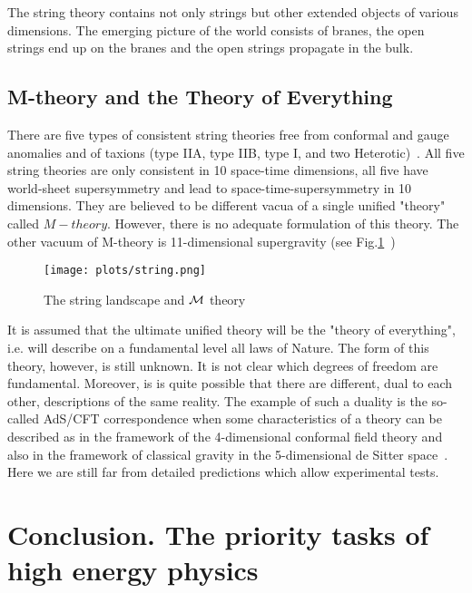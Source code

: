\documentclass{cernyrep}
\begin{document}
The string theory contains not only strings but other extended objects of various dimensions.
The emerging picture of the world consists of branes, the open strings end up on the branes and the open strings propagate in the bulk.


\subsection{M-theory and the Theory of Everything }

There are five types of consistent string theories  free from conformal and gauge anomalies and of taxions (type IIA, type IIB, type I, and two Heterotic)~\cite{heteroic_strings}.  All five string theories are only consistent in 10 space-time dimensions,  all five  have world-sheet supersymmetry and lead to space-time-supersymmetry in 10 dimensions. They are believed to be different vacua of a single unified "theory" called $M-theory$. However, there is no adequate formulation of this theory. The other vacuum of M-theory is 11-dimensional supergravity (see Fig.\ref{M}~\cite{Lukas_talk})
\begin{figure}[htb]
\begin{center}\vspace{0.3cm}
\leavevmode
\texttt{[image: plots/string.png]}
\caption{The string landscape and  ${\cal M}$ theory}
\label{M}
\end{center}
\end{figure}
It is assumed that the ultimate unified theory will be the "theory of everything", i.e. will describe on a fundamental level all laws of Nature. The form of this theory, however, is still unknown. It is not clear which degrees of freedom are fundamental. Moreover, is is quite possible that there are different, dual to each other, descriptions of the same reality. The example of such a duality is the so-called AdS/CFT correspondence when some characteristics of a theory can be described as in the framework of the 4-dimensional conformal field theory and also in the  framework of classical gravity in the 5-dimensional de Sitter space~\cite{Maldacena}. Here we are still far from detailed predictions which allow experimental tests.

\section{Conclusion. The priority tasks of high energy physics}
\end{document}
